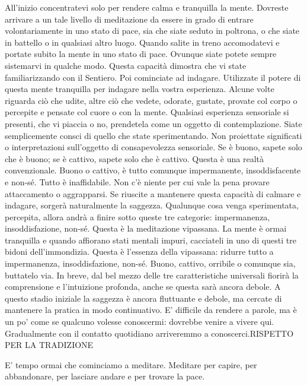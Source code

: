All'inizio concentratevi solo per rendere calma e tranquilla la mente.
Dovreste arrivare a un tale livello di meditazione da essere in grado di
entrare volontariamente in uno stato di pace, sia che siate seduto in
poltrona, o che siate in battello o in qualsiasi altro luogo. Quando
salite in treno accomodatevi e portate subito la mente in uno stato di
pace. Ovunque siate potete sempre sistemarvi in qualche modo. Questa
capacità dimostra che vi state familiarizzando con il Sentiero. Poi
cominciate ad indagare. Utilizzate il potere di questa mente tranquilla
per indagare nella vostra esperienza. Alcune volte riguarda ciò che
udite, altre ciò che vedete, odorate, gustate, provate col corpo o
percepite e pensate col cuore o con la mente. Qualsiasi esperienza
sensoriale si presenti, che vi piaccia o no, prendetela come un oggetto
di contemplazione. Siate semplicemente consci di quello che state
sperimentando. Non proiettate significati o interpretazioni sull'oggetto
di consapevolezza sensoriale. Se è buono, sapete solo che è buono; se è
cattivo, sapete solo che è cattivo. Questa è una realtà convenzionale.
Buono o cattivo, è tutto comunque impermanente, insoddisfacente e
non-sé. Tutto è inaffidabile. Non c'è niente per cui vale la pena
provare attaccamento o aggrapparsi. Se riuscite a mantenere questa
capacità di calmare e indagare, sorgerà naturalmente la saggezza.
Qualunque cosa venga sperimentata, percepita, allora andrà a finire
sotto queste tre categorie: impermanenza, insoddisfazione, non-sé.
Questa è la meditazione vipassana. La mente è ormai tranquilla e quando
affiorano stati mentali impuri, cacciateli in uno di questi tre bidoni
dell'immondizia. Questa è l'essenza della vipassana: ridurre tutto a
impermanenza, insoddisfazione, non-sé. Buono, cattivo, orribile o
comunque sia, buttatelo via. In breve, dal bel mezzo delle tre
caratteristiche universali fiorirà la comprensione e l'intuizione
profonda, anche se questa sarà ancora debole. A questo stadio iniziale
la saggezza è ancora fluttuante e debole, ma cercate di mantenere la
pratica in modo continuativo. E' difficile da rendere a parole, ma è un
po' come se qualcuno volesse conoscermi: dovrebbe venire a vivere qui.
Gradualmente con il contatto quotidiano arriveremmo a
conoscerci.RISPETTO PER LA TRADIZIONE

E' tempo ormai che cominciamo a meditare. Meditare per capire, per
abbandonare, per lasciare andare e per trovare la pace.

